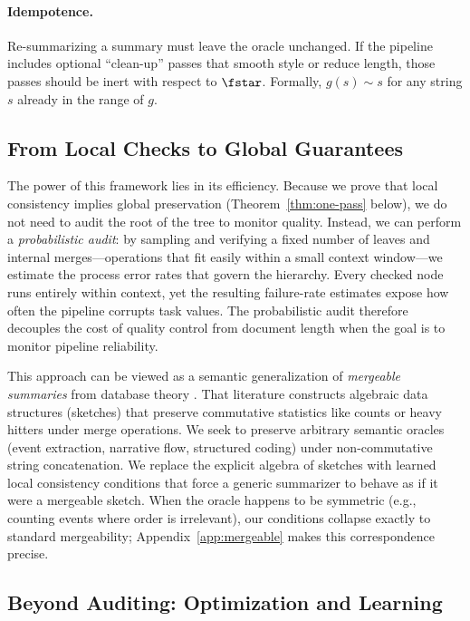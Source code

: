\paragraph{Idempotence.} Re-summarizing a summary must leave the oracle unchanged. If the pipeline includes optional ``clean-up'' passes that smooth style or reduce length, those passes should be inert with respect to $\fstar$. Formally, $g(s) \sim s$ for any string $s$ already in the range of $g$.

\subsection{From Local Checks to Global Guarantees}

The power of this framework lies in its efficiency. Because we prove that local consistency implies global preservation (Theorem~\ref{thm:one-pass} below), we do not need to audit the root of the tree to monitor quality. Instead, we can perform a \emph{probabilistic audit}: by sampling and verifying a fixed number of leaves and internal merges---operations that fit easily within a small context window---we estimate the process error rates that govern the hierarchy. Every checked node runs entirely within context, yet the resulting failure-rate estimates expose how often the pipeline corrupts task values. The probabilistic audit therefore decouples the cost of quality control from document length when the goal is to monitor pipeline reliability.

This approach can be viewed as a semantic generalization of \emph{mergeable summaries} from database theory \citep{agarwal2013mergeable}. That literature constructs algebraic data structures (sketches) that preserve commutative statistics like counts or heavy hitters under merge operations. We seek to preserve arbitrary semantic oracles (event extraction, narrative flow, structured coding) under non-commutative string concatenation. We replace the explicit algebra of sketches with learned local consistency conditions that force a generic summarizer to behave as if it were a mergeable sketch. When the oracle happens to be symmetric (e.g., counting events where order is irrelevant), our conditions collapse exactly to standard mergeability; Appendix~\ref{app:mergeable} makes this correspondence precise.

\subsection{Beyond Auditing: Optimization and Learning}

